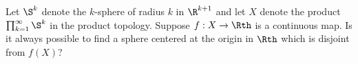 Let $\S^k$ denote the $k$-sphere of radius $k$ in $\R^{k+1}$ and let
$X$ denote the product $\prod_{k=1}^{\infty}\S^k$ in the product
topology. Suppose $f:X\rightarrow \Rth$ is a continuous map. Is it
always possible to find a sphere centered at the origin in $\Rth$ which 
is disjoint from $f(X)$?

